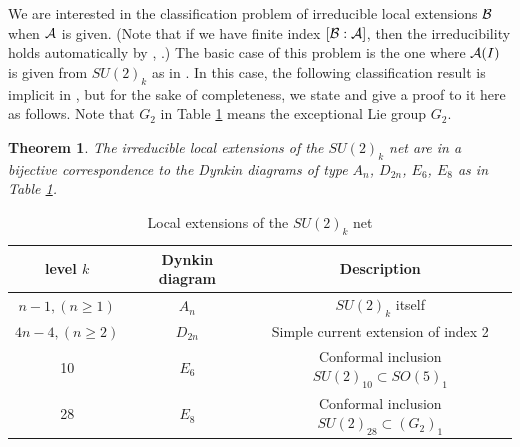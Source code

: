 \documentclass[12pt]{article}
\newtheorem{theorem}{Theorem}[section]
\def\N{{\cal A}}
\def\M{{\cal B}}
\begin{document}
We are interested in the classification problem of irreducible local
extensions $\M$ when $\N$ is given.  (Note that if 
we have finite index $[\M:\N]$, then the irreducibility holds
automatically by \cite[I, Corollary 3.6]{BE}, \cite{DRL}.)
The basic case of this problem is the one where
$\N(I)$ is given from $SU(2)_k$ as in \cite{W}.
In this case, the following classification result is implicit
in \cite{BEK2}, but for the sake of completeness, we state and give
a proof to it here as follows.  Note that $G_2$ in Table \ref{SU2-ext}
means the exceptional Lie group $G_2$.

\begin{theorem}
\label{class-SU2}
The irreducible local extensions of the $SU(2)_k$ net are in
a bijective correspondence to the Dynkin diagrams of
type $A_n$, $D_{2n}$, $E_6$, $E_8$ as in Table \ref{SU2-ext}.
\end{theorem}

\begin{table}[htbp]
\begin{center}
\begin{tabular}{|c|c|c|}\hline
level $k$ & Dynkin diagram & Description \\ \hline
$n-1, (n\ge1)$ & $A_n$ & $SU(2)_k$ itself \\ \hline
$4n-4, (n\ge2)$ & $D_{2n}$ & Simple current extension of index 2 \\ \hline
10 & $E_6$ &  Conformal inclusion $SU(2)_{10}\subset SO(5)_1$ \\ \hline
28 & $E_8$ &  Conformal inclusion $SU(2)_{28}\subset (G_2)_1$ \\ \hline
\end{tabular}
\caption{Local extensions of the $SU(2)_k$ net}
\label{SU2-ext}
\end{center}
\end{table}
\end{document}
